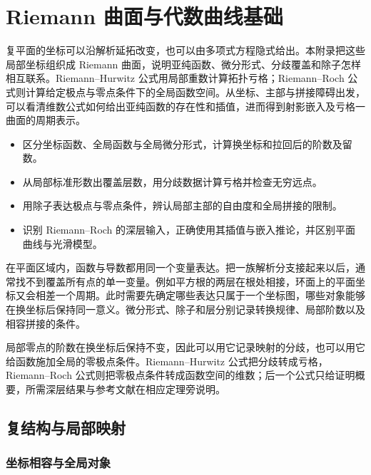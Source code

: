 \chapter{Riemann 曲面与代数曲线基础}
\label{b3:app:A}
\begin{chapterabstract}
复平面的坐标可以沿解析延拓改变，也可以由多项式方程隐式给出。本附录把这些局部坐标组织成 Riemann 曲面，说明亚纯函数、微分形式、分歧覆盖和除子怎样相互联系。Riemann--Hurwitz 公式用局部重数计算拓扑亏格；Riemann--Roch 公式则计算给定极点与零点条件下的全局函数空间。从坐标、主部与拼接障碍出发，可以看清维数公式如何给出亚纯函数的存在性和插值，进而得到射影嵌入及亏格一曲面的周期表示。
\end{chapterabstract}
\begin{learninggoals}
\begin{itemize}
\item\label{b3:item:A-goal-1}区分坐标函数、全局函数与全局微分形式，计算换坐标和拉回后的阶数及留数。
\item\label{b3:item:A-goal-2}从局部标准形数出覆盖层数，用分歧数据计算亏格并检查无穷远点。
\item\label{b3:item:A-goal-3}用除子表达极点与零点条件，辨认局部主部的自由度和全局拼接的限制。
\item\label{b3:item:A-goal-4}识别 Riemann--Roch 的深层输入，正确使用其插值与嵌入推论，并区别平面曲线与光滑模型。
\end{itemize}
\end{learninggoals}

在平面区域内，函数与导数都用同一个变量表达。把一族解析分支接起来以后，通常找不到覆盖所有点的单一变量。例如平方根的两层在根处相接，环面上的平面坐标又会相差一个周期。此时需要先确定哪些表达只属于一个坐标图，哪些对象能够在换坐标后保持同一意义。微分形式、除子和层分别记录转换规律、局部阶数以及相容拼接的条件。

\ProseParagraphBreak
局部零点的阶数在换坐标后保持不变，因此可以用它记录映射的分歧，也可以用它给函数施加全局的零极点条件。Riemann--Hurwitz 公式把分歧转成亏格，Riemann--Roch 公式则把零极点条件转成函数空间的维数；后一个公式只给证明概要，所需深层结果与参考文献在相应定理旁说明。

\section{复结构与局部映射}
\label{b3:sec:A01}

\subsection{坐标相容与全局对象}
\label{b3:subsec:A0101}


